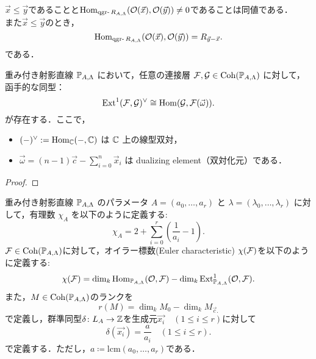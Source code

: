 \begin{prop}\label{lemm:qgr-hom-condition}
	$\vec{x}\le \vec{y}$であることと$\Hom_{\qgr R_{A,\Lambda}}(\mathcal{O}(\vec{x}),\mathcal{O}(\vec{y})) \neq 0$であることは同値である．\\
	また$\vec{x}\le\vec{y}$のとき，
	\[\Hom_{\qgr R_{A,\Lambda}}(\mathcal{O}(\vec{x}),\mathcal{O}(\vec{y}))= R_{\vec{y}- \vec{x}}.\]
	である．
\end{prop}

\begin{thm}\cite{GL87}
	重み付き射影直線 ${\mathbb P}_{A,\Lambda}$ において，任意の連接層 $\mathcal{F}, \mathcal{G} \in \operatorname{\mathrm{Coh}}({\mathbb P}_{A,\Lambda})$ に対して，函手的な同型：
\[
\operatorname{\mathrm{Ext}}^1(\mathcal{F}, \mathcal{G})^\vee \cong \operatorname{\mathrm{Hom}}(\mathcal{G}, \mathcal{F}(\vec{\omega})).
\]
が存在する．ここで，
\begin{itemize}
	\item $(-)^\vee := \operatorname{\mathrm{Hom}}_{{\mathbb C}}(-, {\mathbb C})$ は ${\mathbb C}$ 上の線型双対，
  \item $\vec{\omega} = (n - 1)\vec{c} - \sum_{i=0}^n \vec{x}_i$ は dualizing element（双対化元）である．
\end{itemize}
\end{thm}
\begin{proof}
	
\end{proof}

\begin{defn}
	重み付き射影直線 ${\mathbb P}_{A,\Lambda}$ のパラメータ $A = (a_0, \dots, a_r)$ と $\lambda = (\lambda_0, \dots, \lambda_r)$ に対して，有理数 $\chi_A$ を以下のように定義する:
\[\chi_A = 2 + \sum_{i=0}^{r} \left( \frac{1}{a_i} - 1\right) .\]
${\mathcal F}\in\operatorname{\mathrm{Coh}}({\mathbb P}_{A,\Lambda})$に対して，オイラー標数(Euler characteristic) $\chi({\mathcal F})$を以下のように定義する:
\[ \chi(\mathcal{F}) = \dim_k \operatorname{\mathrm{Hom}}_{{\mathbb P}_{A,\Lambda}}(\mathcal{O}, \mathcal{F}) - \dim_k \operatorname{\mathrm{Ext}}^1_{{\mathbb P}_{A,\Lambda}}(\mathcal{O}, \mathcal{F}) .\]
また，$M\in\operatorname{\mathrm{Coh}}({\mathbb P}_{A,\Lambda})$のランクを
\[r(M) = \dim_k M_{0} - \dim_k M_{\vec{c}.}\]
 で定義し，群準同型$\delta\colon L_A\to {\mathbb Z}$を生成元$\vec{x_i}\quad (1\le i \le r)$に対して
\[\delta(\vec{x_i}) = \frac{a}{a_i}\quad (1\le i\le r).\]
で定義する．ただし，$a\coloneq \text{lcm}(a_0,\ldots ,a_r)$である．
\end{defn}

